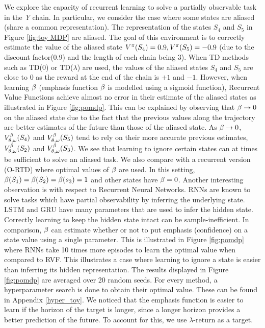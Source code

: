 We explore the capacity of recurrent learning to solve a partially observable task in the \emph{Y} chain. In particular, we consider the case where some states are aliased (share a common representation). The representation of the states $S_4$ and $S_5$ in Figure \ref{fig:toy MDP} are aliased. The goal of this environment is to correctly estimate the value of the aliased state $V^{\pi}(S_4)=0.9,V^{\pi}(S_5)=-0.9$ (due to the discount factor(0.9) and the length of each chain being 3). When TD methods such as TD($0$) or TD($\lambda$) are used, the values of the aliased states $S_4$ and $S_5$ are close to $0$ as the reward at the end of the chain is $+1$ and $-1$.  However, when learning $\beta$ (emphasis function $\beta$ is modelled using a sigmoid function), Recurrent Value Functions achieve almost no error in their estimate of the aliased states as illustrated in Figure \ref{fig:pomdp}. This can be explained by observing that $\beta \rightarrow 0$ on the aliased state due to the fact that the previous values along the trajectory are better estimates of the future than those of the aliased state. As $\beta \to 0$, $V^{\beta}_{\theta, \omega}(S_4)$ and $V^{\beta}_{\theta, \omega}(S_5)$ tend to rely on their more accurate previous estimates, $V^{\beta}_{\theta, \omega}(S_2)$ and $V^{\beta}_{\theta, \omega}(S_3)$. We see that learning to ignore certain states can at times be sufficient to solve an aliased task. We also compare with a recurrent version (O-RTD) where optimal values of $\beta$ are used. In this setting,  $\beta(S_1)=\beta(S_2) = \beta(s_3) = 1 $ and other states have $\beta = 0$. Another interesting observation is with respect to Recurrent Neural Networks. RNNs are known to solve tasks which have partial observability by inferring the underlying state. LSTM and GRU have many parameters that are used to infer the hidden state. Correctly learning to keep the hidden state intact can be sample-inefficient. In comparison, $\beta$ can estimate whether or not to put emphasis (confidence) on a state value using a single parameter. This is illustrated in Figure \ref{fig:pomdp} where RNNs take 10 times more episodes to learn the optimal value when compared to RVF. This illustrates a case where learning to ignore a state is easier than inferring its hidden representation. The results displayed in Figure \ref{fig:pomdp} are averaged over 20 random seeds. For every method, a hyperparameter search is done to obtain their optimal value. These can be found in Appendix \ref{hyper_toy}. We noticed that the emphasis function is easier to learn if the horizon of the target is longer, since a longer horizon provides a better prediction of the future. To account for this, we use $\lambda$-return as a target.
